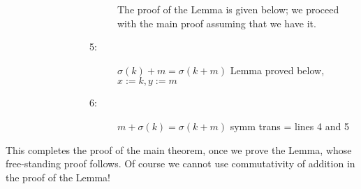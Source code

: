 \documentclass[12pt]{book}
\begin{document}
\begin{description}
\begin{description}
\begin{description}
\begin{description}
The proof of the Lemma is given below; we proceed with the main proof assuming that we have it.

\item[5:]  $\sigma(k)+m = \sigma(k+m)$  Lemma proved below, $x:=k, y:=m$

\item[6:] $m+\sigma(k)=\sigma(k+m)$  symm trans = lines 4 and 5

\end{description}


\end{description}

\end{description}

\end{description}

This completes the proof of the main theorem, once we prove the Lemma, whose free-standing proof follows.
Of course we cannot use commutativity of addition in the proof of the Lemma!
\end{document}

